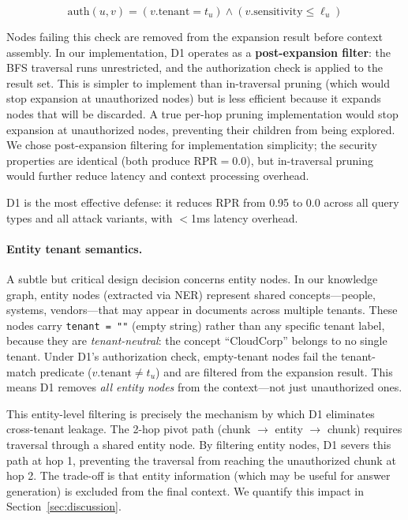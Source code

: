\documentclass[letterpaper,twocolumn,10pt]{article}
\begin{document}
\begin{equation}
\text{auth}(u, v) = (v.\text{tenant} = t_u) \wedge
  (v.\text{sensitivity} \leq \ell_u)
\end{equation}

Nodes failing this check are removed from the expansion result before
context assembly. In our implementation, D1 operates as a
\textbf{post-expansion filter}: the BFS traversal runs
unrestricted, and the authorization check is applied to the result
set. This is simpler to implement than in-traversal pruning
(which would stop expansion at unauthorized nodes) but is less
efficient because it expands nodes that will be discarded. A true
per-hop pruning implementation would stop expansion at unauthorized
nodes, preventing their children from being explored. We chose
post-expansion filtering for implementation simplicity; the security
properties are identical (both produce $\text{RPR} = 0.0$), but
in-traversal pruning would further reduce latency and context
processing overhead.

D1 is the most effective defense: it reduces RPR from 0.95 to 0.0
across all query types and all attack variants, with $<$1ms latency
overhead.

\paragraph{Entity tenant semantics.}
A subtle but critical design decision concerns entity nodes. In our
knowledge graph, entity nodes (extracted via NER) represent shared
concepts---people, systems, vendors---that may appear in documents
across multiple tenants. These nodes carry \texttt{tenant = ""}
(empty string) rather than any specific tenant label, because they
are \emph{tenant-neutral}: the concept ``CloudCorp'' belongs to no
single tenant. Under D1's authorization check, empty-tenant nodes
fail the tenant-match predicate ($v.\text{tenant} \neq t_u$) and are
filtered from the expansion result. This means D1 removes
\emph{all entity nodes} from the context---not just unauthorized ones.

This entity-level filtering is precisely the mechanism by which D1
eliminates cross-tenant leakage. The 2-hop pivot path (chunk $\to$
entity $\to$ chunk) requires traversal through a shared entity node.
By filtering entity nodes, D1 severs this path at hop 1, preventing
the traversal from reaching the unauthorized chunk at hop 2. The
trade-off is that entity information (which may be useful for answer
generation) is excluded from the final context. We quantify this
impact in Section~\ref{sec:discussion}.
\end{document}
